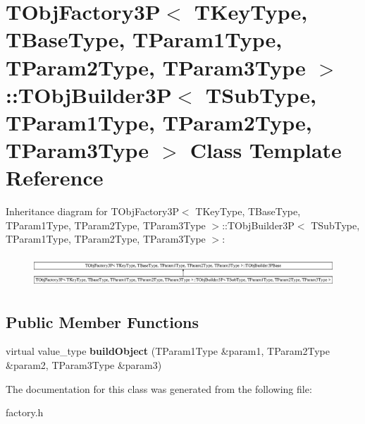 \hypertarget{class_t_obj_factory3_p_1_1_t_obj_builder3_p}{\section{T\+Obj\+Factory3\+P$<$ T\+Key\+Type, T\+Base\+Type, T\+Param1\+Type, T\+Param2\+Type, T\+Param3\+Type $>$\+:\+:T\+Obj\+Builder3\+P$<$ T\+Sub\+Type, T\+Param1\+Type, T\+Param2\+Type, T\+Param3\+Type $>$ Class Template Reference}
\label{class_t_obj_factory3_p_1_1_t_obj_builder3_p}
}
Inheritance diagram for T\+Obj\+Factory3\+P$<$ T\+Key\+Type, T\+Base\+Type, T\+Param1\+Type, T\+Param2\+Type, T\+Param3\+Type $>$\+:\+:T\+Obj\+Builder3\+P$<$ T\+Sub\+Type, T\+Param1\+Type, T\+Param2\+Type, T\+Param3\+Type $>$\+:\begin{figure}[H]
\begin{center}
\leavevmode
\includegraphics[height=1.178947cm]{class_t_obj_factory3_p_1_1_t_obj_builder3_p}
\end{center}
\end{figure}
\subsection*{Public Member Functions}
\begin{DoxyCompactItemize}
\item 
\hypertarget{class_t_obj_factory3_p_1_1_t_obj_builder3_p_a729255483f8abee94b6907c4b49d3ef6}{virtual value\+\_\+type {\bfseries build\+Object} (T\+Param1\+Type \&param1, T\+Param2\+Type \&param2, T\+Param3\+Type \&param3)}\label{class_t_obj_factory3_p_1_1_t_obj_builder3_p_a729255483f8abee94b6907c4b49d3ef6}

\end{DoxyCompactItemize}


The documentation for this class was generated from the following file\+:\begin{DoxyCompactItemize}
\item 
factory.\+h\end{DoxyCompactItemize}
